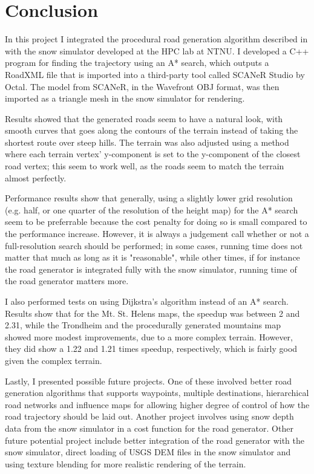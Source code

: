 \chapter{Conclusion}
\label{chap:conclusion}
In this project I integrated the procedural road generation algorithm described in \cite{roadgen} with the snow simulator developed at the HPC lab at NTNU. I developed a C++ program for finding the trajectory using an A* search, which outputs a RoadXML file that is imported into a third-party tool called SCANeR Studio by Octal. The model from SCANeR, in the Wavefront OBJ format, was then imported as a triangle mesh in the snow simulator for rendering.

Results showed that the generated roads seem to have a natural look, with smooth curves that goes along the contours of the terrain instead of taking the shortest route over steep hills. The terrain was also adjusted using a method where each terrain vertex' y-component is set to the y-component of the closest road vertex; this seem to work well, as the roads seem to match the terrain almost perfectly.

Performance results show that generally, using a slightly lower grid resolution (e.g. half, or one quarter of the resolution of the height map) for the A* search seem to be preferrable because the cost penalty for doing so is small compared to the performance increase. However, it is always a judgement call whether or not a full-resolution search should be performed; in some cases, running time does not matter that much as long as it is "reasonable", while other times, if for instance the road generator is integrated fully with the snow simulator, running time of the road generator matters more. %

I also performed tests on using Dijkstra's algorithm instead of an A* search. Results show that for the Mt. St. Helens maps, the speedup was between 2 and 2.31, while the Trondheim and the procedurally generated mountains map showed more modest improvements, due to a more complex terrain. However, they did show a 1.22 and 1.21 times speedup, respectively, which is fairly good given the complex terrain.

Lastly, I presented possible future projects. One of these involved better road generation algorithms that supports waypoints, multiple destinations, hierarchical road networks and influence maps for allowing higher degree of control of how the road trajectory should be laid out. Another project involves using snow depth data from the snow simulator in a cost function for the road generator. Other future potential project include better integration of the road generator with the snow simulator, direct loading of USGS DEM files in the snow simulator and using texture blending for more realistic rendering of the terrain.

